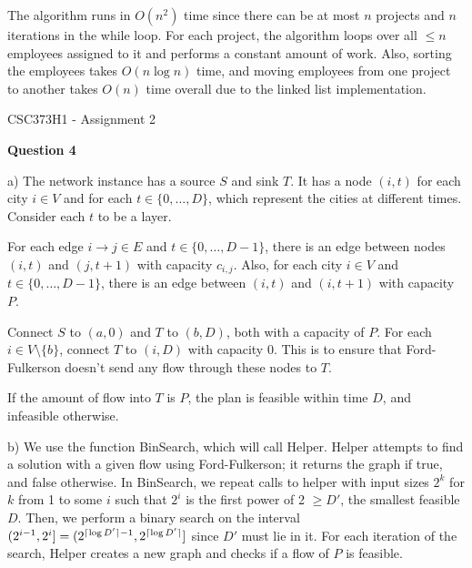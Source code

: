 \documentclass[11pt]{article}
\DeclarePairedDelimiter{\ceil}{\lceil}{\rceil}
\begin{document}
The algorithm runs in $O(n^2)$ time since there can be at most $n$ projects and $n$ iterations in the while loop. For each project, the algorithm loops over all $\leq n$ employees assigned to it and performs a constant amount of work. Also, sorting the employees takes $O(n\log n)$ time, and moving employees from one project to another takes $O(n)$ time overall due to the linked list implementation.\\

\begin{center}
{\Large CSC373H1 - Assignment 2}
\end{center}

\textbf{Question 4}

a) The network instance has a source $S$ and sink $T$. It has a node $(i,t)$ for each city $i\in V$ and for each $t\in \{0,\ldots,D\}$, which represent the cities at different times. Consider each $t$ to be a layer.

For each edge $i\to j \in E$ and $t\in \{0,\ldots,D-1\}$, there is an edge between nodes $(i,t)$ and $(j,t+1)$ with capacity $c_{i,j}$. Also, for each city $i\in V$ and $t\in \{0,\ldots,D-1\}$, there is an edge between $(i,t)$ and $(i,t+1)$ with capacity $P$.

Connect $S$ to $(a,0)$ and $T$ to $(b,D)$, both with a capacity of $P$. For each $i\in V\setminus\{b\}$, connect $T$ to $(i,D)$ with capacity 0. This is to ensure that Ford-Fulkerson doesn't send any flow through these nodes to $T$.

If the amount of flow into $T$ is $P$, the plan is feasible within time $D$, and infeasible otherwise.

b) We use the function BinSearch, which will call Helper. Helper attempts to find a solution with a given flow using Ford-Fulkerson; it returns the graph if true, and false otherwise. In BinSearch, we repeat calls to helper with input sizes $2^k$ for $k$ from 1 to some $i$ such that $2^i$ is the first power of 2 $\geq D'$, the smallest feasible $D$. Then, we perform a binary search on the interval $(2^{i-1},2^i]=(2^{\ceil{\log D'}-1}, 2^{\ceil{\log D'}}]$ since $D'$ must lie in it. For each iteration of the search, Helper creates a new graph and checks if a flow of $P$ is feasible.

\end{document}
